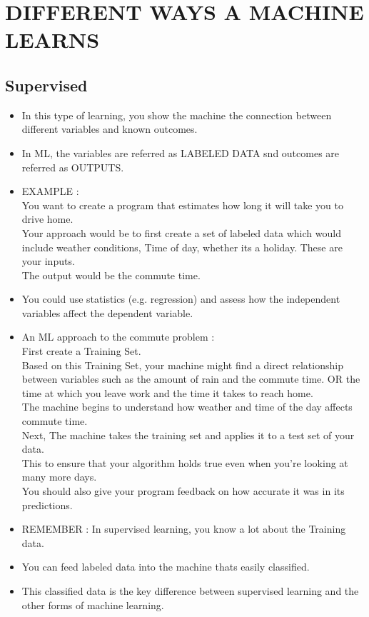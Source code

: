 \documentclass[11pt, oneside]{article}   	%
\begin{document}
\section{DIFFERENT WAYS A MACHINE LEARNS}
\subsection{Supervised}
\begin{itemize}
\item In this type of learning, you show the machine the connection between different variables and known outcomes.
\item In ML, the variables are referred as LABELED DATA snd outcomes are referred as OUTPUTS.
\item EXAMPLE : \\
You want to create a program that estimates how long it will take you to drive home. \\
Your approach would be to first create a set of labeled data which would include weather conditions, Time of day, whether its a holiday. These are your inputs. \\
The output would be the commute time.
\item You could use statistics (e.g. regression) and assess how the independent variables affect the dependent variable.
\item  An ML approach to the commute problem : \\
First create a Training Set. \\
Based on this Training Set, your machine might find a direct relationship between variables such as the amount of rain and the commute time. OR the time at which you leave work and the time it takes to reach home.\\
The machine begins to understand how weather and time of the day affects commute time. \\
\bigskip 
Next, The machine takes the training set and applies it to a test set of your data. \\
This to ensure that your algorithm holds true even when you're looking at many more days.\\
You should also give your program feedback on how accurate it was in its predictions.\\
\item REMEMBER : In supervised learning, you know a lot about the Training data.
\item You can feed labeled data into the machine thats easily classified.
\item This classified data is the key difference between supervised learning and the other forms of machine learning.
\end{itemize}
\end{document}
